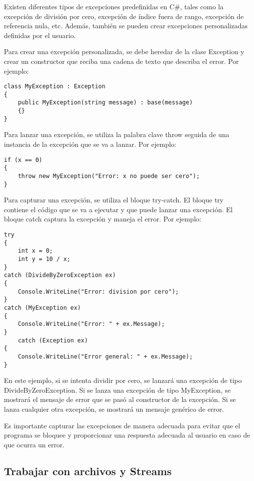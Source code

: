 \documentclass[executivepaper]{article}
\begin{document}
Existen diferentes tipos de excepciones predefinidas en C\#, tales como la excepción de división por cero, excepción de índice fuera de rango, excepción de referencia nula, etc. Además, también se pueden crear excepciones personalizadas definidas por el usuario.

Para crear una excepción personalizada, se debe heredar de la clase Exception y crear un constructor que reciba una cadena de texto que describa el error. Por ejemplo:

\begin{lstlisting}
class MyException : Exception
{
    public MyException(string message) : base(message)
    {}
}
\end{lstlisting}

Para lanzar una excepción, se utiliza la palabra clave throw seguida de una instancia de la excepción que se va a lanzar. Por ejemplo:

\begin{lstlisting}
if (x == 0)
{
    throw new MyException("Error: x no puede ser cero");
}
\end{lstlisting}

Para capturar una excepción, se utiliza el bloque try-catch. El bloque try contiene el código que se va a ejecutar y que puede lanzar una excepción. El bloque catch captura la excepción y maneja el error. Por ejemplo:

\begin{lstlisting}
try
{
    int x = 0;
    int y = 10 / x;
}
catch (DivideByZeroException ex)
{
    Console.WriteLine("Error: division por cero");
}
catch (MyException ex)
{
    Console.WriteLine("Error: " + ex.Message);
}
    catch (Exception ex)
{
    Console.WriteLine("Error general: " + ex.Message);
}
\end{lstlisting}

En este ejemplo, si se intenta dividir por cero, se lanzará una excepción de tipo DivideByZeroException. Si se lanza una excepción de tipo MyException, se mostrará el mensaje de error que se pasó al constructor de la excepción. Si se lanza cualquier otra excepción, se mostrará un mensaje genérico de error.

Es importante capturar las excepciones de manera adecuada para evitar que el programa se bloquee y proporcionar una respuesta adecuada al usuario en caso de que ocurra un error.

\subsection{Trabajar con archivos y Streams}
\end{document}
